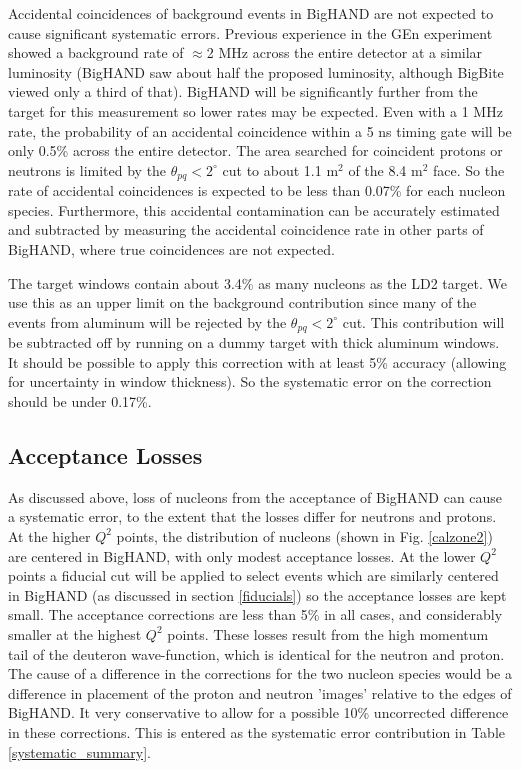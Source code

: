 \documentclass[12pt,letterpaper,oneside]{article}
\begin{document}
Accidental coincidences of background events in BigHAND are not
expected to cause significant systematic errors.  Previous experience
in the GEn experiment\cite{GEn-proposal}  
showed a background rate of $\approx$2 MHz
across the entire detector at a similar luminosity (BigHAND saw about 
half the proposed luminosity, although BigBite viewed only a third of
that).  BigHAND will be
significantly further from the target for this measurement so lower
rates may be expected.  Even with a 1 MHz rate, the probability of an
accidental coincidence within a 5 ns timing gate will be only 0.5\%
across the entire detector.  The area searched for coincident protons
or neutrons is limited by the $\theta_{pq}<2^\circ$ cut to about 1.1
m$^2$ of the 8.4 m$^2$ face.  So the rate of accidental coincidences
is expected to be less than 0.07\% for each nucleon species.
Furthermore, this accidental contamination can be accurately estimated
and subtracted by measuring the accidental coincidence rate in other
parts of BigHAND, where true coincidences are not expected.


The target windows contain about 3.4\% as many nucleons as the LD2
target.  We use this as an upper limit on the background contribution
since many of the events from aluminum will be rejected by the
$\theta_{pq}<2^\circ$ cut.  This contribution will be subtracted off
by running on a dummy target with thick aluminum windows.  It should
be possible to apply this correction with at least 5\% accuracy (allowing for
uncertainty in window thickness).  So the systematic error on the
correction should be under 0.17\%.


\subsection{Acceptance Losses}

As discussed above, loss of nucleons from the acceptance of BigHAND
can cause a systematic error, to the extent that the losses differ for
neutrons and protons.  At the higher $Q^2$ points, the distribution of
nucleons (shown in Fig. \ref{calzone2}) are centered in BigHAND,
with only modest acceptance losses.  At the lower $Q^2$ points a
fiducial cut will be applied to select events which are similarly
centered in BigHAND (as discussed in section \ref{fiducials}) so the
acceptance losses are kept small. 
The acceptance corrections are less than 5\%
in all cases, and considerably smaller at the highest $Q^2$ points.  
These losses
result from the high momentum tail of the deuteron wave-function, which
is identical for the neutron and proton.  The cause of a difference in
the corrections for the two nucleon species would be a difference in
placement of the proton and neutron 'images' relative to the edges of
BigHAND.  It very conservative to allow for a possible 10\%
uncorrected difference in these corrections.  This is entered as the
systematic error contribution in Table \ref{systematic_summary}.
\end{document}
